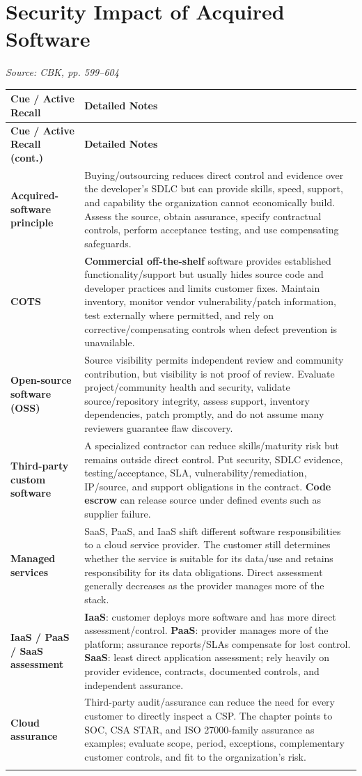 \documentclass[10pt,letterpaper]{article}
\makeatletter
\newenvironment{cornell}{\rowcolors{2}{white}{notebg}\begin{longtable}{@{}>{\raggedright\arraybackslash\columncolor{cuebg}\color{navy}\bfseries}p{0.285\textwidth}>{\raggedright\arraybackslash}p{0.65\textwidth}@{}}\rowcolor{navy}\color{white}\textbf{Cue / Active Recall} & \color{white}\textbf{Detailed Notes}\\ \hline\endfirsthead\rowcolor{navy}\color{white}\textbf{Cue / Active Recall (cont.)} & \color{white}\textbf{Detailed Notes}\\ \hline\endhead}{\end{longtable}}
\newcommand{\noterow}[2]{#1 & #2\\\arrayrulecolor{line}\hline}\newcommand{\source}[1]{\par{\footnotesize\color{teal}\textit{Source: CBK, #1}}\par}
\makeatother
\begin{document}
\section{\color{navy}Security Impact of Acquired Software}
\source{pp. 599--604}
\begin{cornell}
\noterow{Acquired-software principle}{Buying/outsourcing reduces direct control and evidence over the developer's SDLC but can provide skills, speed, support, and capability the organization cannot economically build. Assess the source, obtain assurance, specify contractual controls, perform acceptance testing, and use compensating safeguards.}
\noterow{COTS}{\textbf{Commercial off-the-shelf} software provides established functionality/support but usually hides source code and developer practices and limits customer fixes. Maintain inventory, monitor vendor vulnerability/patch information, test externally where permitted, and rely on corrective/compensating controls when defect prevention is unavailable.}
\noterow{Open-source software (OSS)}{Source visibility permits independent review and community contribution, but visibility is not proof of review. Evaluate project/community health and security, validate source/repository integrity, assess support, inventory dependencies, patch promptly, and do not assume many reviewers guarantee flaw discovery.}
\noterow{Third-party custom software}{A specialized contractor can reduce skills/maturity risk but remains outside direct control. Put security, SDLC evidence, testing/acceptance, SLA, vulnerability/remediation, IP/source, and support obligations in the contract. \textbf{Code escrow} can release source under defined events such as supplier failure.}
\noterow{Managed services}{SaaS, PaaS, and IaaS shift different software responsibilities to a cloud service provider. The customer still determines whether the service is suitable for its data/use and retains responsibility for its data obligations. Direct assessment generally decreases as the provider manages more of the stack.}
\noterow{IaaS / PaaS / SaaS assessment}{\textbf{IaaS}: customer deploys more software and has more direct assessment/control. \textbf{PaaS}: provider manages more of the platform; assurance reports/SLAs compensate for lost control. \textbf{SaaS}: least direct application assessment; rely heavily on provider evidence, contracts, documented controls, and independent assurance.}
\noterow{Cloud assurance}{Third-party audit/assurance can reduce the need for every customer to directly inspect a CSP. The chapter points to SOC, CSA STAR, and ISO 27000-family assurance as examples; evaluate scope, period, exceptions, complementary customer controls, and fit to the organization's risk.}
\end{cornell}
\end{document}

